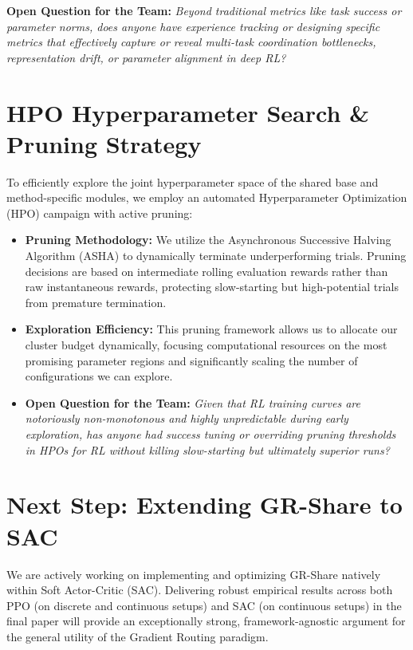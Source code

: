 \documentclass[11pt,a4paper]{article}
\begin{document}
\textbf{Open Question for the Team:} \textit{Beyond traditional metrics like task success or parameter norms, does anyone have experience tracking or designing specific metrics that effectively capture or reveal multi-task coordination bottlenecks, representation drift, or parameter alignment in deep RL?}
\section{HPO Hyperparameter Search \& Pruning Strategy}
To efficiently explore the joint hyperparameter space of the shared base and method-specific modules, we employ an automated Hyperparameter Optimization (HPO) campaign with active pruning:
\begin{itemize}
    \item \textbf{Pruning Methodology:} We utilize the Asynchronous Successive Halving Algorithm (ASHA) to dynamically terminate underperforming trials. Pruning decisions are based on intermediate rolling evaluation rewards rather than raw instantaneous rewards, protecting slow-starting but high-potential trials from premature termination.
    \item \textbf{Exploration Efficiency:} This pruning framework allows us to allocate our cluster budget dynamically, focusing computational resources on the most promising parameter regions and significantly scaling the number of configurations we can explore.
    \item \textbf{Open Question for the Team:} \textit{Given that RL training curves are notoriously non-monotonous and highly unpredictable during early exploration, has anyone had success tuning or overriding pruning thresholds in HPOs for RL without killing slow-starting but ultimately superior runs?}
\end{itemize}
\section{Next Step: Extending GR-Share to SAC}
We are actively working on implementing and optimizing GR-Share natively within Soft Actor-Critic (SAC). Delivering robust empirical results across both PPO (on discrete and continuous setups) and SAC (on continuous setups) in the final paper will provide an exceptionally strong, framework-agnostic argument for the general utility of the Gradient Routing paradigm.
\end{document}
